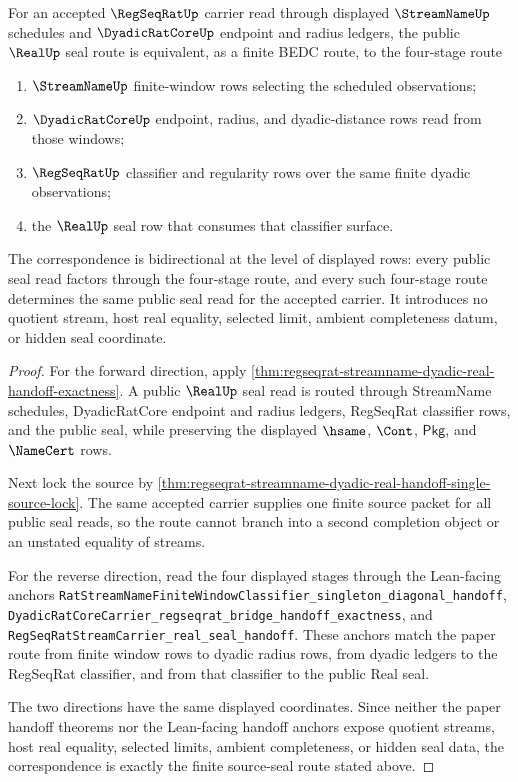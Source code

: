 \begin{theorem}
\label{thm:regseqrat-streamname-dyadic-real-source-seal-correspondence}
For an accepted $\RegSeqRatUp$ carrier read through displayed
$\StreamNameUp$ schedules and $\DyadicRatCoreUp$ endpoint and radius ledgers,
the public $\RealUp$ seal route is equivalent, as a finite BEDC route, to the
four-stage route
\begin{enumerate}
\item $\StreamNameUp$ finite-window rows selecting the scheduled observations;
\item $\DyadicRatCoreUp$ endpoint, radius, and dyadic-distance rows read from
those windows;
\item $\RegSeqRatUp$ classifier and regularity rows over the same finite
dyadic observations;
\item the $\RealUp$ seal row that consumes that classifier surface.
\end{enumerate}
The correspondence is bidirectional at the level of displayed rows: every
public seal read factors through the four-stage route, and every such
four-stage route determines the same public seal read for the accepted
carrier. It introduces no quotient stream, host real equality, selected limit,
ambient completeness datum, or hidden seal coordinate.
\end{theorem}
\begin{proof}
For the forward direction, apply
\autoref{thm:regseqrat-streamname-dyadic-real-handoff-exactness}. A public
$\RealUp$ seal read is routed through StreamName schedules, DyadicRatCore
endpoint and radius ledgers, RegSeqRat classifier rows, and the public seal,
while preserving the displayed $\hsame$, $\Cont$, $\mathsf{Pkg}$, and
$\NameCert$ rows.

Next lock the source by
\autoref{thm:regseqrat-streamname-dyadic-real-handoff-single-source-lock}. The
same accepted carrier supplies one finite source packet for all public seal
reads, so the route cannot branch into a second completion object or an
unstated equality of streams.

For the reverse direction, read the four displayed stages through the
Lean-facing anchors
\texttt{RatStreamNameFiniteWindowClassifier\_singleton\_diagonal\_handoff},
\texttt{DyadicRatCoreCarrier\_regseqrat\_bridge\_handoff\_exactness}, and
\texttt{RegSeqRatStreamCarrier\_real\_seal\_handoff}. These anchors match the
paper route from finite window rows to dyadic radius rows, from dyadic ledgers
to the RegSeqRat classifier, and from that classifier to the public Real seal.

The two directions have the same displayed coordinates. Since neither the
paper handoff theorems nor the Lean-facing handoff anchors expose quotient
streams, host real equality, selected limits, ambient completeness, or hidden
seal data, the correspondence is exactly the finite source-seal route stated
above.
\end{proof}

